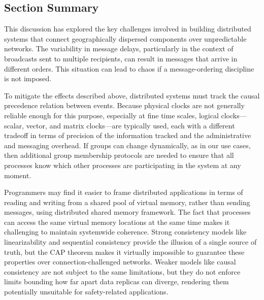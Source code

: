 \documentclass[]             %
{NASA}                       %
\theoremstyle{definition}
\begin{document}
\subsection{Section Summary}
\label{ssec:background-summary}
This discussion has explored the key challenges involved in building
distributed systems that connect geographically dispersed components
over unpredictable networks. The variability in message delays,
particularly in the context of broadcasts sent to multiple recipients,
can result in messages that arrive in different orders.  This
situation can lead to chaos if a message-ordering discipline is not
imposed.

To mitigate the effects described above, distributed systems must
track the causal precedence relation between events. Because physical
clocks are not generally reliable enough for this purpose, especially
at fine time scales, logical clocks---scalar, vector, and matrix
clocks---are typically used, each with a different tradeoff in terms
of precision of the information tracked and the administrative and
messaging overhead. If groups can change dynamically, as in our use
cases, then additional group membership protocols are needed to ensure
that all processes know which other processes are participating in the
system at any moment.

Programmers may find it easier to frame distributed applications in
terms of reading and writing from a shared pool of virtual memory,
rather than sending messages, using distributed shared memory
framework. The fact that processes can access the same virtual memory
locations at the same time makes it challenging to maintain systemwide
coherence. Strong consistency models like linearizability and
sequential consistency provide the illusion of a single source of
truth, but the CAP theorem makes it virtually impossible to guarantee
these properties over connection-challenged networks. Weaker models
like causal consistency are not subject to the same limitations, but
they do not enforce limits bounding how far apart data replicas can
diverge, rendering them potentially unsuitable for safety-related
applications.

\end{document}
